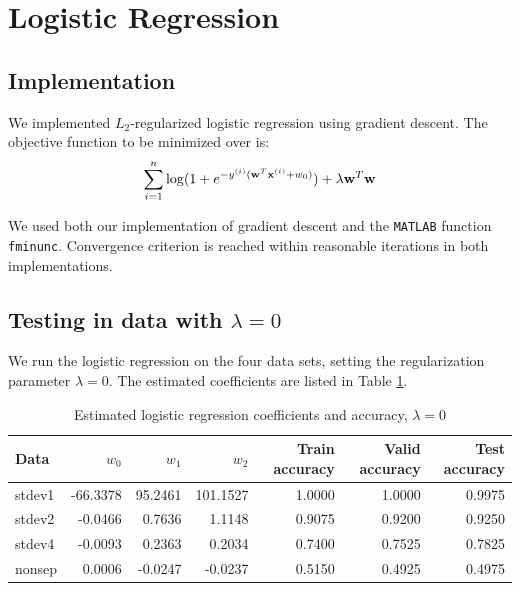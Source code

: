 
\section{Logistic Regression}\label{sec:lr}

\subsection{Implementation}
We implemented $L_2$-regularized logistic regression using gradient descent. The objective function to be minimized over is:
\begin{equation}
\sum_{i=1}^n \log (1 + e^{-y^{(i)}(\boldsymbol{\mathbf{w}}^T\boldsymbol{\mathbf{x}}^{(i)} + w_0)}) + \lambda \boldsymbol{\mathbf{w}}^T\boldsymbol{\mathbf{w}}
\end{equation}

We used both our implementation of gradient descent and the \texttt{MATLAB} function \texttt{fminunc}. Convergence criterion is reached within reasonable iterations in both implementations.

\subsection{Testing in data with $\lambda = 0$}
We run the logistic regression on the four data sets, setting the regularization parameter $\lambda = 0$. The estimated coefficients are listed in Table \ref{tab:LR_reg_coeff}.

\begin{table}[h!]
\centering
\caption{Estimated logistic regression coefficients and accuracy, $\lambda = 0$ }
\begin{tabular}{lrrrrrr}
  \hline\hline
  Data   & $w_0$ 	& $w_1$ 	  & $w_2$ 	& Train accuracy & Valid accuracy & Test accuracy\\
  \hline
  stdev1 & -66.3378  & 95.2461 & 101.1527 & 1.0000    & 1.0000    & 0.9975\\
  stdev2 & -0.0466   & 0.7636  & 1.1148 	& 0.9075    & 0.9200    & 0.9250\\
  stdev4 & -0.0093   & 0.2363  & 0.2034 	& 0.7400    & 0.7525    & 0.7825\\
  nonsep & 0.0006    & -0.0247 & -0.0237	& 0.5150    & 0.4925	   & 0.4975\\
  \hline\hline
\end{tabular}\label{tab:LR_reg_coeff}
\end{table}

